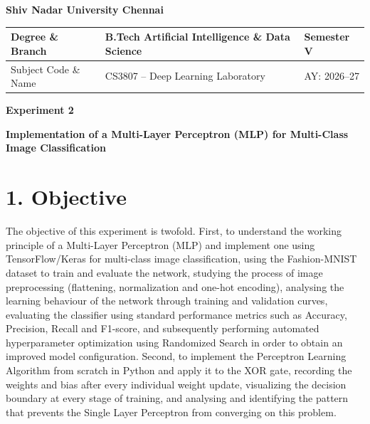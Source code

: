 \documentclass[11pt,a4paper]{article}
\begin{document}
\raggedbottom

\setlength{\textfloatsep}{10pt}
\setlength{\floatsep}{8pt}
\setlength{\intextsep}{8pt}


\begin{center}

{\Large \textbf{Shiv Nadar University Chennai}}

\vspace{0.3cm}

\begin{tabular}{|p{4cm}|p{8cm}|p{2cm}|}
\hline
Degree \& Branch &
B.Tech Artificial Intelligence \& Data Science &
Semester V\\
\hline
Subject Code \& Name &
CS3807 -- Deep Learning Laboratory &
AY: 2026--27\\
\hline
\end{tabular}

\vspace{0.7cm}

{\Large \textbf{Experiment 2}}

\vspace{0.2cm}

{\large \textbf{Implementation of a Multi-Layer Perceptron (MLP) for Multi-Class Image Classification}}

\end{center}

\section*{1. Objective}

The objective of this experiment is twofold. First, to understand the working principle of a Multi-Layer Perceptron (MLP) and implement one using TensorFlow/Keras for multi-class image classification, using the Fashion-MNIST dataset to train and evaluate the network, studying the process of image preprocessing (flattening, normalization and one-hot encoding), analysing the learning behaviour of the network through training and validation curves, evaluating the classifier using standard performance metrics such as Accuracy, Precision, Recall and F1-score, and subsequently performing automated hyperparameter optimization using Randomized Search in order to obtain an improved model configuration. Second, to implement the Perceptron Learning Algorithm from scratch in Python and apply it to the XOR gate, recording the weights and bias after every individual weight update, visualizing the decision boundary at every stage of training, and analysing and identifying the pattern that prevents the Single Layer Perceptron from converging on this problem.
\end{document}
